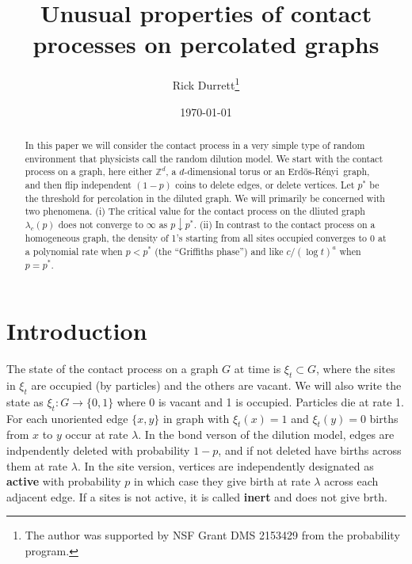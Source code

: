 \documentclass[11pt]{article}
\theoremstyle{definition}
\def\ZZ{\mathbb{Z}}
\def\ER{Erd\"os-R\'enyi\ }
\begin{document}
\title{Unusual properties of contact \\ processes on percolated graphs}
\author{Rick Durrett\thanks{The author was supported by NSF Grant DMS 2153429 from the probability program.}}


\date{\today}						

\maketitle

				

\begin{abstract}
In this paper we will consider the contact process in a very simple type of random environment that physicists call the random dilution model. We start with the contact process on a graph, here either $\ZZ^d$, a $d$-dimensional torus or an \ER graph, and then flip independent $(1-p)$ coins to delete edges, or delete vertices. Let $p^*$ be the threshold for percolation in the diluted graph. We will primarily be concerned with two phenomena. (i) The critical value for the contact process on the dliuted graph $\lambda_c(p)$ does not converge to $\infty$ as $p \downarrow p^*$. (ii) In contrast to the contact process on a homogeneous graph, the density of 1's starting from all sites occupied converges to 0 at a polynomial rate when $p<p^*$ (the ``Griffiths phase'') and like $c/(\log t)^a$ when $p=p^*$. 
\end{abstract}


\section{Introduction}

The state of the contact process on a graph $G$ at time is $\xi_t \subset G$, where the sites in $\xi_t$ are occupied (by particles) and the others are vacant. We will also write the state as $\xi_t: G \to \{0,1\}$ where 0 is vacant and 1 is occupied. Particles die at rate 1. For each unoriented edge $\{x,y\}$ in graph with $\xi_t(x)=1$ and $\xi_t(y)=0$ births from $x$ to $y$ occur at rate $\lambda$. In the bond verson of the dilution model, edges are indpendently deleted with probability $1-p$, and if not deleted have births across them at rate $\lambda$. In the site version, vertices are independently designated as {\bf active} with probability $p$ in which case they give birth at rate $\lambda$ across each adjacent edge. If a sites is not active, it is called {\bf inert} and does not give brth.
\end{document}
